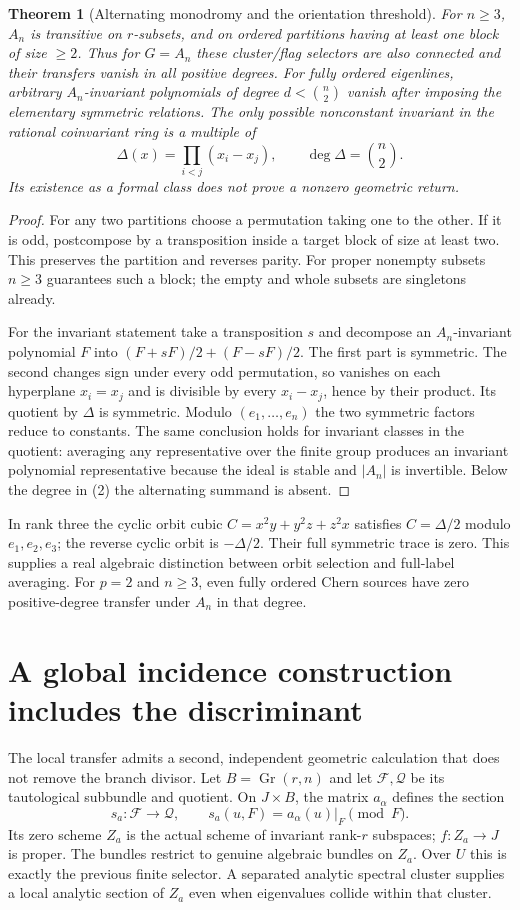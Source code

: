 \documentclass[11pt]{article}
\newtheorem{theorem}{Theorem}
\begin{document}
\begin{theorem}[Alternating monodromy and the orientation threshold]
For $n\geq3$, $A_n$ is transitive on $r$-subsets, and on ordered
partitions having at least one block of size $\geq2$. Thus for $G=A_n$
these cluster/flag selectors are also connected and their transfers vanish
in all positive degrees. For fully ordered eigenlines, arbitrary
$A_n$-invariant polynomials of degree $d<\binom n2$ vanish after imposing
the elementary symmetric relations. The only possible nonconstant
invariant in the rational coinvariant ring is a multiple of
\[
 \Delta(x)=\prod_{i<j}(x_i-x_j),\qquad \deg\Delta=\binom n2.\tag{2}
\]
Its existence as a formal class does not prove a nonzero geometric return.
\end{theorem}
\begin{proof}
For any two partitions choose a permutation taking one to the other.
If it is odd, postcompose by a transposition inside a target block of
size at least two. This preserves the partition and reverses parity.
For proper nonempty subsets $n\geq3$ guarantees such a block; the
empty and whole subsets are singletons already.

For the invariant statement take a transposition $s$ and decompose an
$A_n$-invariant polynomial $F$ into $(F+sF)/2+(F-sF)/2$. The first part
is symmetric. The second changes sign under every odd permutation, so
vanishes on each hyperplane $x_i=x_j$ and is divisible by every
$x_i-x_j$, hence by their product. Its quotient by $\Delta$ is symmetric.
Modulo $(e_1,\ldots,e_n)$ the two symmetric factors reduce to constants.
The same conclusion holds for invariant classes in the quotient: averaging
any representative over the finite group produces an invariant polynomial
representative because the ideal is stable and $|A_n|$ is invertible.
Below the degree in (2) the alternating summand is absent.
\end{proof}
In rank three the cyclic orbit cubic
$C=x^2y+y^2z+z^2x$ satisfies
$C=\Delta/2$ modulo $e_1,e_2,e_3$; the reverse cyclic orbit is
$-\Delta/2$. Their full symmetric trace is zero. This supplies a real
algebraic distinction between orbit selection and full-label averaging.
For $p=2$ and $n\geq3$, even fully ordered Chern sources have zero
positive-degree transfer under $A_n$ in that degree.

\section{A global incidence construction includes the discriminant}
The local transfer admits a second, independent geometric calculation that
does not remove the branch divisor. Let $B=\operatorname{Gr}(r,n)$ and
let $\mathcal F,\mathcal Q$ be its tautological subbundle and quotient.
On $J\times B$, the matrix $a_\alpha$ defines the section
\[
 s_a:\mathcal F\longrightarrow\mathcal Q,\qquad
 s_a(u,F)=a_\alpha(u)|_F\pmod F.
\]
Its zero scheme $Z_a$ is the actual scheme of invariant rank-$r$ subspaces;
$f:Z_a\to J$ is proper. The bundles restrict to genuine algebraic bundles
on $Z_a$. Over $U$ this is exactly the previous finite selector. A separated
analytic spectral cluster supplies a local analytic section of $Z_a$ even
when eigenvalues collide within that cluster.
\end{document}
